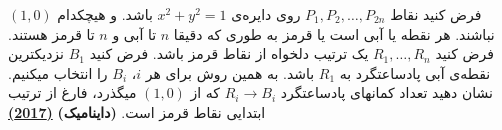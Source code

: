 فرض کنید نقاط $P_1, P_2, \dots, P_{2n}$ روی دایره‌ی $x^2 + y^2 = 1$ باشد. 
و هیچکدام $(1, 0)$ نباشند.
هر نقطه یا آبی است یا قرمز به طوری که دقیقا $n$ تا آبی و $n$ تا قرمز هستند.
فرض کنید $R_1, \dots, R_n$ یک ترتیب دلخواه از نقاط قرمز باشد.
فرض کنید $B_1$ نزدیکترین نقطه‌‌ی آبی پادساعتگرد به $R_1$ باشد.
به همین روش برای هر $i$، $B_i$ را انتخاب میکنیم.
نشان دهید تعداد کمانهای پادساعتگرد $R_i \to B_i$ که از $(1, 0)$ میگذرد، فارغ از ترتیب ابتدایی نقاط قرمز است.
\textbf{(داینامیک)}
\href{https://artofproblemsolving.com/community/c5h1434584p8117190}{\textbf{(2017)}}